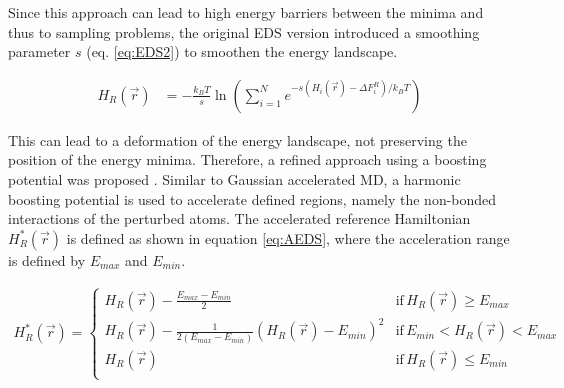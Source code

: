Since this approach can lead to high energy barriers between the minima and thus to sampling problems, the original EDS version introduced a smoothing parameter $s$ (eq. \ref{eq:EDS2}) to smoothen the energy landscape. 

\begin{equation}
\begin{aligned}
H_R(\vec{r}) & = -\frac{k_BT}{s} \ln  \left( \sum_{i=1}^{N} e^{ -s(H_i(\vec{r}) - \Delta F_{i}^R)/k_BT} \right) 
\end{aligned}
\label{eq:EDS2}
\end{equation}

This can lead to a deformation of the energy landscape, not preserving the position of the energy minima. Therefore, a refined approach using a boosting potential was proposed \cite{JP2018,JP2020}. Similar to Gaussian accelerated MD, a harmonic boosting potential is used to accelerate defined regions, namely the non-bonded interactions of the perturbed atoms. The accelerated reference Hamiltonian $H_R^{\ast}(\vec{r})$ is defined as shown in equation \ref{eq:AEDS}, where the acceleration range is defined by $E_{max}$ and $E_{min}$. 

\begin{equation}
  \begin{aligned}
H_R^{\ast}(\vec{r}) =\begin{cases}
        H_R(\vec{r}) - \frac{E_{max} - E_{min}}{2} &\text{if} \, H_R(\vec{r}) \geq E_{max} \\

        H_R(\vec{r}) - \frac{1}{2(E_{max} - E_{min})}(H_R(\vec{r}) -  E_{min})^2 &\text{if} \,  E_{min} < H_R(\vec{r}) < E_{max} \\

        H_R(\vec{r}) &\text{if} \, H_R(\vec{r}) \leq E_{min} \\
     \end{cases}
  \end{aligned}
  \label{eq:AEDS}
\end{equation}


